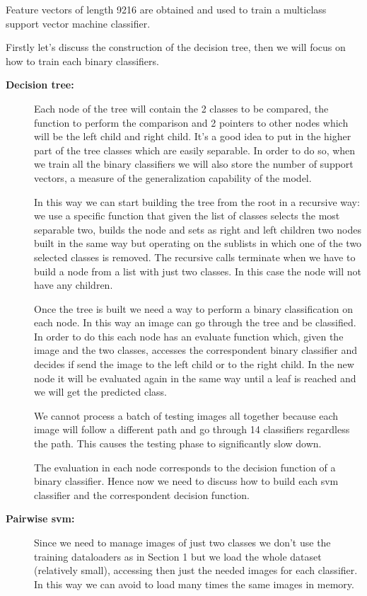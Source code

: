 \documentclass[12pt, a4paper]{report}
\begin{document}
Feature vectors of length 9216 are obtained and used to train a multiclass support vector machine classifier. 	

Firstly let's discuss the construction of the decision tree, then we will focus on how to train each binary classifiers.

\begin{description}
	\item[\textbf{Decision tree:}] 
	Each node of the tree will contain the 2 classes to be compared, the function to perform the comparison and 2 pointers to other nodes which will be the left child and right child.
	It's a good idea to put in the higher part of the tree classes which are easily separable. In order to do so, when we train all the binary classifiers we will also store the number of support vectors, a measure of the generalization capability of the model.
	
	In this way we can start building the tree from the root in a recursive way: we use a specific function that given the list of classes selects the most separable two, builds the node and sets as right and left children two nodes built in the same way but operating on the sublists in which one of the two selected classes is removed.
	The recursive calls terminate when we have to build a node from a list with just two classes. In this case the node will not have any children.
	
	Once the tree is built we need a way to perform a binary classification on each node. In this way an image can go through the tree and be classified.
	In order to do this each node has an evaluate function which, given the image and the two classes, accesses the correspondent binary classifier and decides if send the image to the left child or to the right child. In the new node it will be evaluated again in the same way until a leaf is reached and we will get the predicted class. 
	
	We cannot process a batch of testing images all together because each image will follow a different path and go through 14 classifiers regardless the path.
	This causes the testing phase to significantly slow down.
	
	The evaluation in each node corresponds to the decision function of a binary classifier. Hence now we need to discuss how to build each svm classifier and the correspondent decision function.
	
	
	\item[\textbf{Pairwise svm:}] Since we need to manage images of just two classes we don't use the training dataloaders as in Section 1 but we load the whole dataset (relatively small), accessing then just the needed images for each classifier. In this way we can avoid to load many times the same images in memory.
	

\end{description}
\end{document}
